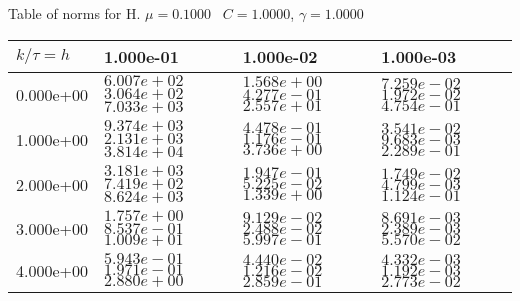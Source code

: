 \begin{center}
Table of norms for H. $\mu = 0.1000$ \, $C = 1.0000$, $\gamma = 1.0000$
  
\begin{tabular}{|p{1in}|p{1in}|p{1in}|p{1in}|} \hline
$k / \tau = h$ &1.000e-01 &1.000e-02 &1.000e-03 \\ \hline 
0.000e+00 & $6.007e+02$  $3.064e+02$  $7.033e+03$  & $1.568e+00$  $4.277e-01$  $2.557e+01$  & $7.259e-02$  $1.972e-02$  $4.754e-01$  \\ \hline 
1.000e+00 & $9.374e+03$  $2.131e+03$  $3.814e+04$  & $4.478e-01$  $1.176e-01$  $3.736e+00$  & $3.541e-02$  $9.683e-03$  $2.289e-01$  \\ \hline 
2.000e+00 & $3.181e+03$  $7.419e+02$  $8.624e+03$  & $1.947e-01$  $5.225e-02$  $1.339e+00$  & $1.749e-02$  $4.799e-03$  $1.124e-01$  \\ \hline 
3.000e+00 & $1.757e+00$  $8.537e-01$  $1.009e+01$  & $9.129e-02$  $2.488e-02$  $5.997e-01$  & $8.691e-03$  $2.389e-03$  $5.570e-02$  \\ \hline 
4.000e+00 & $5.943e-01$  $1.971e-01$  $2.880e+00$  & $4.440e-02$  $1.216e-02$  $2.859e-01$  & $4.332e-03$  $1.192e-03$  $2.773e-02$  \\ \hline 

\end{tabular}\\[20pt]
\end{center}

